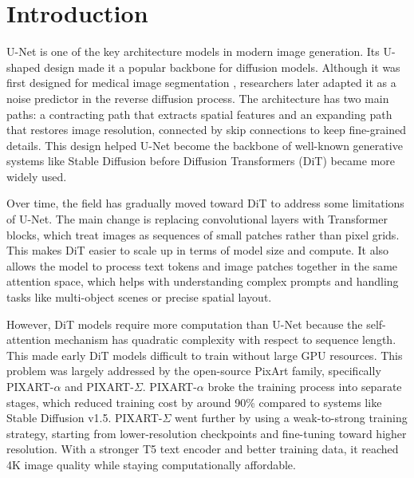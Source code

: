 \documentclass[12pt,onecolumn]{IEEEtran}
\begin{document}
\section{Introduction} %
U-Net is one of the key architecture models in modern image generation. Its U-shaped design made it a popular backbone for diffusion models. Although it was first designed for medical image segmentation \cite{ronneberger2015unet}, researchers later adapted it as a noise predictor in the reverse diffusion process. The architecture has two main paths: a contracting path that extracts spatial features and an expanding path that restores image resolution, connected by skip connections to keep fine-grained details. This design helped U-Net become the backbone of well-known generative systems like Stable Diffusion \cite{rombach2022latent} before Diffusion Transformers (DiT) \cite{peebles2023scalable} became more widely used.

Over time, the field has gradually moved toward DiT to address some limitations of U-Net. The main change is replacing convolutional layers with Transformer blocks, which treat images as sequences of small patches rather than pixel grids. This makes DiT easier to scale up in terms of model size and compute. It also allows the model to process text tokens and image patches together in the same attention space, which helps with understanding complex prompts and handling tasks like multi-object scenes or precise spatial layout.

However, DiT models require more computation than U-Net because the self-attention mechanism has quadratic complexity with respect to sequence length. This made early DiT models difficult to train without large GPU resources. This problem was largely addressed by the open-source PixArt \cite{chen2023pixartalpha, chen2024pixartsigma} family, specifically PIXART-$\alpha$ and PIXART-$\Sigma$. PIXART-$\alpha$ broke the training process into separate stages, which reduced training cost by around 90\% compared to systems like Stable Diffusion v1.5. PIXART-$\Sigma$ went further by using a weak-to-strong training strategy, starting from lower-resolution checkpoints and fine-tuning toward higher resolution. With a stronger T5 text encoder and better training data, it reached 4K image quality while staying computationally affordable.
\end{document}
